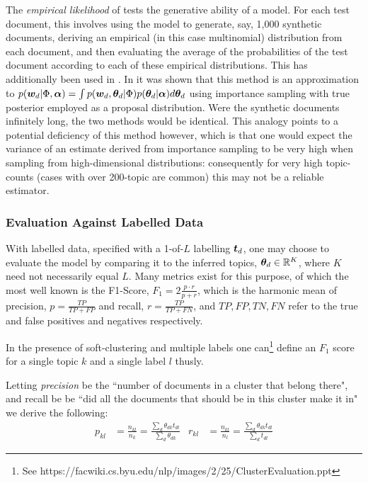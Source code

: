 
The \emph{empirical likelihood} of \cite{Li2006} tests the generative ability of a model. For each test document, this involves using the model to generate, say, 1,000 synthetic documents, deriving an empirical (in this case multinomial) distribution from each document, and then evaluating the average of the probabilities of the test document according to each of these empirical distributions. This has additionally been used in \cite{Doyle2009}\cite{Mimno2008}. In \cite{Wallach2009} it was shown that this method is an approximation to $p(\bm w_d|\Phi, \bm \alpha) = \int p(\bm w_d, { \bm \theta_d } | \Phi)p({ \bm \theta_d }|\bm \alpha)d{ \bm \theta_d }$ using importance sampling with true posterior employed as a proposal distribution. Were the synthetic documents infinitely long, the two methods would be identical. This analogy points to a potential deficiency of this method however, which is that one would expect the variance of an estimate derived from importance sampling to be very high when sampling from high-dimensional distributions: consequently for very high topic-counts (cases with over 200-topic are common) this may not be a reliable estimator.

\subsubsection*{Evaluation Against Labelled Data}
With labelled data, specified with a 1-of-$L$ labelling $\bm t_d$, one may choose to evaluate the model by comparing it to the inferred topics, ${ \bm \theta_d } \in { \mathbb{R}^{K} }$, where $K$ need not necessarily equal $L$. Many metrics exist for this purpose, of which the most well known is the F1-Score, $F_1 = 2 \frac{p \cdot r}{p + r}$, which is the harmonic mean of precision, $p=\frac{TP}{TP+FP}$ and recall, $r=\frac{TP}{TP+FN}$, and $TP, FP, TN, FN$ refer to the true and false positives and negatives respectively.

In the presence of soft-clustering and multiple labels one can\footnote{See https://facwiki.cs.byu.edu/nlp/images/2/25/ClusterEvaluation.ppt} define an $F_1$ score for a single topic $k$ and a single label $l$ thusly.

Letting \emph{precision} be the ``number of documents in a cluster that belong there", and recall be be ``did all the documents that should be in this cluster make it in" we derive the following:
\begin{align}
p_{kl} & = \frac{n_{kl}}{n_k} = \frac{\sum_d \theta_{dk} t_{dl}}{\sum_d \theta_{dk}}  & r_{kl} & = \frac{n_{kl}}{n_l} = \frac{\sum_d \theta_{dk} t_{dl}}{\sum_d t_{dl}} \label{eqn:myrecall}
\end{align}

